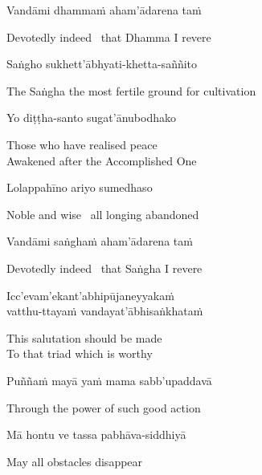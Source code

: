Vandāmi dhammaṁ aham'ādarena taṁ

\begin{english}
  Devotedly indeed \breathmark\ that Dhamma I revere
\end{english}

Saṅgho sukhett'ābhyati-khetta-saññito

\begin{english}
  The Saṅgha the most fertile ground for cultivation
\end{english}

Yo diṭṭha-santo sugat'ānubodhako

\begin{english}
  Those who have realised peace\\
  Awakened after the Accomplished One
\end{english}

Lolappahīno ariyo sumedhaso

\begin{english}
  Noble and wise \breathmark\ all longing abandoned
\end{english}

Vandāmi saṅghaṁ aham'ādarena taṁ

\begin{english}
  Devotedly indeed \breathmark\ that Saṅgha I revere
\end{english}

Icc'evam'ekant'abhipūjaneyyakaṁ\\
vatthu-ttayaṁ vandayat'ābhisaṅkhataṁ

\begin{english}
  This salutation should be made\\
  To that triad\makeatletter\hyperlink{endnote11-appendix}\makeatother
  which is worthy
\end{english}

Puññaṁ mayā yaṁ mama sabb'upaddavā

\begin{english}
  Through the power of such good action
\end{english}

Mā hontu ve tassa pabhāva-siddhiyā

\begin{english}
  May all obstacles disappear
\end{english}

